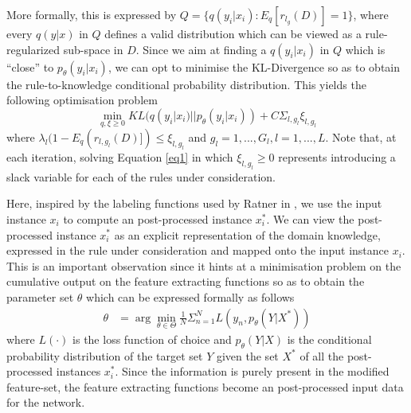 \documentclass[12pt,a4paper]{article}
\begin{document}
More formally, this is expressed by \begin{math}Q = \{ q(y_i|x_i) : E_q[r_{l_g}(D)] = 1 \}\end{math}, where every \begin{math}q(y|x)\end{math} in \begin{math}Q\end{math} defines a valid distribution which can be viewed as a rule-regularized sub-space in \begin{math}D\end{math}. Since we aim at finding a \begin{math}q(y_i|x_i)\end{math} in \begin{math}Q\end{math} which is ``close'' to \begin{math}p_\theta(y_i|x_i)\end{math}, we can opt to minimise the KL-Divergence so as to obtain the rule-to-knowledge conditional probability distribution.  This yields the following optimisation problem
\begin{equation} 
\label{eq1}
\min_{q,\xi \geq 0} KL(q(y_i|x_i)||p_\theta(y_i|x_i)) + C\Sigma_{l,g_l} \xi_{l,g_l}
\end{equation}
where $\lambda_l(1 - E_q(r_{l,g_l}(D)]) \leq \xi_{l,g_l}$ and $g_l = 1,...,G_l, l = 1,...,L$. Note that, at each iteration, solving Equation \ref{eq1} in which $\xi_{l,g_l} \geq 0$ represents introducing a slack variable for each of the rules under consideration.
\vspace{2mm}

Here, inspired by the labeling functions used by Ratner in \cite{Ratner:2017}, we use the input instance $x_i$ to compute an post-processed instance $x_i^*$.
We can view the post-processed instance $x_i^*$ as an explicit representation of the domain knowledge, expressed in the rule under consideration and mapped onto the input instance $x_i$. This is an important observation since it hints at a minimisation problem on the cumulative output on the feature extracting functions so as to obtain the parameter set $\theta$ which can be expressed formally as follows
\begin{equation} \label{eq3}
\begin{split}
\theta & = \arg\min_{\theta\in\Theta}\frac{1}{N}\Sigma_{n=1}^{N}L(y_n,p_\theta(Y|X^*))
\end{split}
\end{equation}
where $L(\cdot)$ is the loss function of choice and \begin{math}p_\theta(Y|X)\end{math} is the conditional probability distribution of the target set $Y$ given the set $X^*$ of all the post-processed instances $x_i^*$. Since the information is purely present in the modified feature-set, the feature extracting functions become an post-processed input data for the network.
\vspace{2mm}
\end{document}
